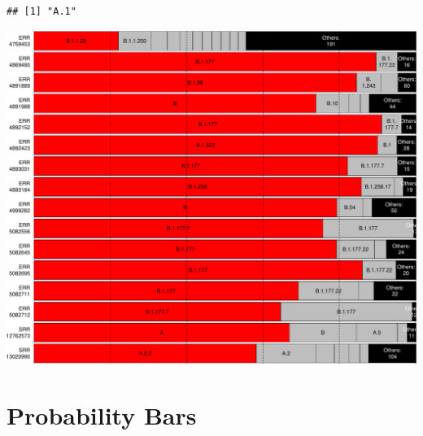 \documentclass[]{article}
\begin{document}
\begin{verbatim}
## [1] "A.1"
\end{verbatim}

\includegraphics{pangolin_results_report_d_files/figure-latex/pareto-1.pdf}

\hypertarget{probability-bars}{%
\section{Probability Bars}\label{probability-bars}}
\end{document}
